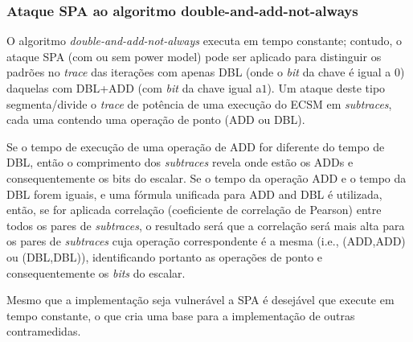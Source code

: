 \documentclass{SBCbookchapter}
\begin{document}
\subsubsection{Ataque SPA ao algoritmo double-and-add-not-always}
O algoritmo \textit{double-and-add-not-always} executa em tempo constante; contudo, o ataque SPA (com ou sem power model) pode ser aplicado para distinguir os padrões no \textit{trace} das iterações com apenas DBL (onde o \textit{bit} da chave é igual a $0$) daquelas com DBL+ADD (com \textit{bit} da chave igual a$1$). Um ataque deste tipo segmenta/divide o \textit{trace} de potência de uma execução do ECSM em \textit{subtraces}, cada uma contendo uma operação de ponto (ADD ou DBL). 

Se o tempo de execução de uma operação de ADD for diferente do tempo de DBL, então o comprimento dos \textit{subtraces} revela onde estão os ADDs e consequentemente os bits do escalar. Se o tempo da operação ADD e o tempo da DBL forem iguais, e uma fórmula unificada para ADD and DBL é utilizada, então, se for aplicada correlação (coeficiente de correlação de Pearson) entre todos os pares de \textit{subtraces}, o resultado será que a correlação será mais alta para os pares de \emph{subtraces} cuja operação correspondente é a mesma (i.e., (ADD,ADD) ou (DBL,DBL)), identificando portanto as operações de ponto e consequentemente os \textit{bits} do escalar.

Mesmo que a implementação seja vulnerável a SPA é desejável que execute em tempo constante, o que cria uma base para a implementação de outras contramedidas. 

\end{document}
